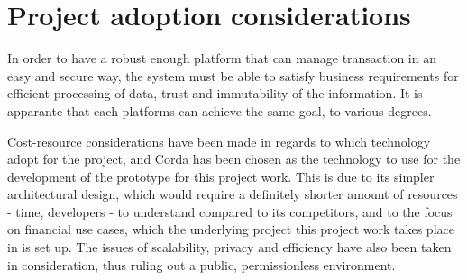 \section{Project adoption considerations}

In order to have a robust enough platform that can manage transaction in an easy and secure way, the system must be able to satisfy business requirements for efficient processing of data, trust and immutability of the information.
It is apparante that each platforms can achieve the same goal, to various degrees.

Cost-resource considerations have been made in regards to which technology adopt for the project, and Corda has been chosen as the technology to use for the development of the prototype for this project work. 
This is due to its simpler architectural design, which would require a definitely shorter amount of resources - time, developers - to understand compared to its competitors, and to the focus on financial use cases, which the underlying project this project work takes place in is set up.
The issues of scalability, privacy and efficiency have also been taken in consideration, thus ruling out a public, permissionless environment. 

